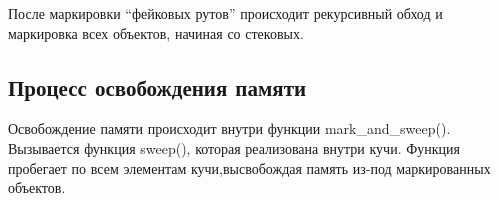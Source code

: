 После маркировки ``фейковых рутов'' происходит рекурсивный обход и маркировка всех объектов, начиная со стековых.

\subsection{Процесс освобождения памяти}

Освобождение памяти происходит внутри функции mark\_and\_sweep(). Вызывается функция sweep(), которая реализована внутри кучи. Функция пробегает по всем элементам кучи,высвобождая память из-под маркированных объектов.
